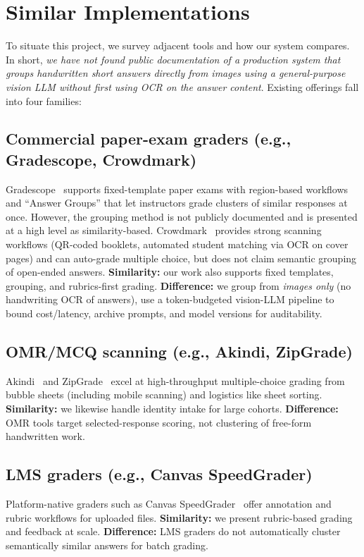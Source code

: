 \documentclass[ms,twoside,print]{nuthesis}
\newcommand{\Brand}[1]{\mbox{#1}} %
\begin{document}
\section{Similar Implementations}
To situate this project, we survey adjacent tools and how our system compares. In short,
\emph{we have not found public documentation of a production system that groups handwritten
short answers directly from images using a general-purpose vision LLM without first using OCR on the
answer content}. Existing offerings fall into four families:

\subsection{Commercial paper-exam graders (e.g., \Brand{Gradescope}, \Brand{Crowdmark})}
\Brand{Gradescope}~\cite{gradescope} supports fixed-template paper exams with region-based workflows and
\enquote{Answer Groups} that let instructors grade clusters of similar responses at once. However, the
grouping method is not publicly documented and is presented at a high level as similarity-based.
\Brand{Crowdmark}~\cite{crowdmark} provides strong scanning workflows (QR-coded booklets, automated
student matching via OCR on cover pages) and can auto-grade multiple choice, but does not claim
semantic grouping of open-ended answers. \textbf{Similarity:} our work also supports fixed templates,
grouping, and rubrics-first grading. \textbf{Difference:} we group from \emph{images only} (no handwriting
OCR of answers), use a token-budgeted vision-LLM pipeline to bound cost/latency, archive
prompts, and model versions for auditability.

\subsection{OMR/MCQ scanning (e.g., \Brand{Akindi}, \Brand{ZipGrade})}
\Brand{Akindi}~\cite{akindi} and \Brand{ZipGrade}~\cite{zipgrade} excel at high-throughput multiple-choice grading from
bubble sheets (including mobile scanning) and logistics like sheet sorting. \textbf{Similarity:} we likewise
handle identity intake for large cohorts. \textbf{Difference:} OMR tools target selected-response scoring,
not clustering of free-form handwritten work.

\subsection{LMS graders (e.g., \Brand{Canvas} SpeedGrader)}
Platform-native graders such as \Brand{Canvas} SpeedGrader~\cite{canvas-speedgrader} offer annotation and rubric
workflows for uploaded files. \textbf{Similarity:} we present rubric-based grading and feedback at scale.
\textbf{Difference:} LMS graders do not automatically cluster semantically similar answers for batch grading.
\end{document}
